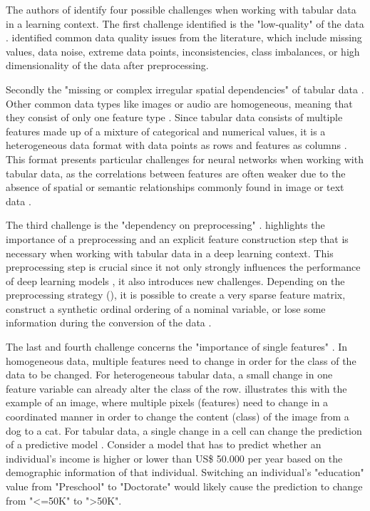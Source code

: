 The authors of \cite{borisov2022DeepNeuralNetworks} identify four possible challenges when working with tabular data in a learning context.
The first challenge identified is the "low-quality" of the data \cite[p. 4]{borisov2022DeepNeuralNetworks}. 
\textcite{borisov2022DeepNeuralNetworks} identified common data quality issues from the literature, which include missing values, data noise, extreme data points, inconsistencies, class imbalances, or high dimensionality of the data after preprocessing.

Secondly the "missing or complex irregular spatial dependencies" of tabular data \cite[p. 4]{borisov2022DeepNeuralNetworks}. 
Other common data types like images or audio are homogeneous, meaning that they consist of only one feature type \cite{borisov2022DeepNeuralNetworks}.
Since tabular data consists of multiple features made up of a mixture of categorical and numerical values, it is a heterogeneous data format with data points as rows and features as columns \cite{borisov2022DeepNeuralNetworks}.
This format presents particular challenges for neural networks when working with tabular data, as the correlations between features are often weaker due to the absence of spatial or semantic relationships commonly found in image or text data \cite{borisov2022DeepNeuralNetworks, yoon2020VIMEExtendingSuccess}.

The third challenge is the "dependency on preprocessing" \cite[p. 4]{borisov2022DeepNeuralNetworks}. 
\cite{borisov2022DeepNeuralNetworks} highlights the importance of a preprocessing and an explicit feature construction step that is necessary when working with tabular data in a deep learning context.
This preprocessing step is crucial since it not only strongly influences the performance of deep learning models \cite{gorishniy2022EmbeddingsNumericalFeatures}, it also introduces new challenges. 
Depending on the preprocessing strategy (), it is possible to create a very sparse feature matrix, construct a synthetic ordinal ordering of a nominal variable, or lose some information during the conversion of the data \cite{borisov2022DeepNeuralNetworks}.

The last and fourth challenge concerns the "importance of single features" \cite[p. 4]{borisov2022DeepNeuralNetworks}. 
In homogeneous data, multiple features need to change in order for the class of the data to be changed. 
For heterogeneous tabular data, a small change in one feature variable can already alter the class of the row. 
\cite{borisov2022DeepNeuralNetworks} illustrates this with the example of an image, where multiple pixels (\ie features) need to change in a coordinated manner in order to change the content (\ie class) of the image from a dog to a cat.
For tabular data, a single change in a cell can change the prediction of a predictive model \cite{borisov2022DeepNeuralNetworks}. 
Consider a model that has to predict whether an individual's income is higher or lower than US\$ 50.000 per year \cite{Dua:2019} based on the demographic information of that individual.
Switching an individual's "education" value from "Preschool" to "Doctorate" would likely cause the prediction to change from "<=50K" to ">50K".


